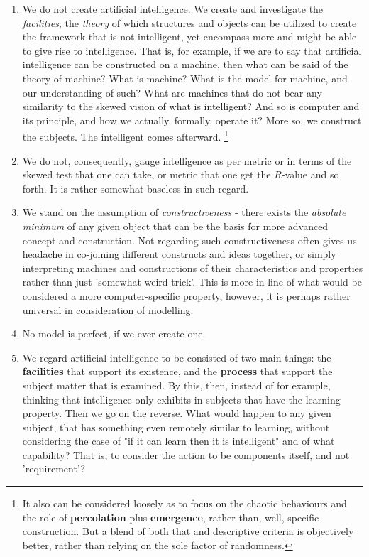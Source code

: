 \begin{enumerate}[itemsep=1pt,topsep=0.5pt]
    \item We do not create artificial intelligence. We create and investigate the \textit{facilities}, the \textit{theory} of which structures and objects can be utilized to create the framework that is not intelligent, yet encompass more and might be able to give rise to intelligence. That is, for example, if we are to say that artificial intelligence can be constructed on a machine, then what can be said of the theory of machine? What is machine? What is the model for machine, and our understanding of such? What are machines that do not bear any similarity to the skewed vision of what is intelligent? And so is computer and its principle, and how we actually, formally, operate it? More so, we construct the subjects. The intelligent comes afterward. \footnote{ It also can be considered loosely as to focus on the chaotic behaviours and the role of \textbf{percolation} plus \textbf{emergence}, rather than, well, specific construction. But a blend of both that and descriptive criteria is objectively better, rather than relying on the sole factor of randomness.}
    \item We do not, consequently, gauge intelligence as per metric or in terms of the skewed test that one can take, or metric that one get the $R$-value and so forth. It is rather somewhat baseless in such regard. 
    \item We stand on the assumption of \textit{constructiveness} - there exists the \textit{absolute minimum} of any given object that can be the basis for more advanced concept and construction. Not regarding such constructiveness often gives us headache in co-joining different constructs and ideas together, or simply interpreting machines and constructions of their characteristics and properties rather than just 'somewhat weird trick'. This is more in line of what would be considered a more computer-specific property, however, it is perhaps rather universal in consideration of modelling. 
    \item No model is perfect, if we ever create one. 
    \item We regard artificial intelligence to be consisted of two main things: the \textbf{facilities} that support its existence, and the \textbf{process} that support the subject matter that is examined. By this, then, instead of for example, thinking that intelligence only exhibits in subjects that have the learning property. Then we go on the reverse. What would happen to any given subject, that has something even remotely similar to learning, without considering the case of "if it can learn then it is intelligent" and of what capability? That is, to consider the action to be components itself, and not 'requirement'?
\end{enumerate}
